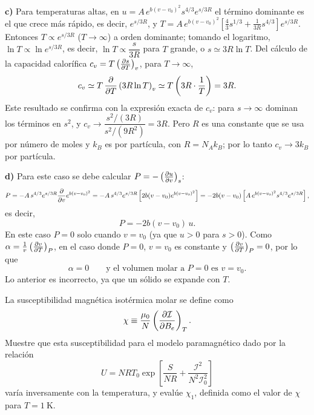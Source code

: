 \begin{solucion}
  \textbf{c)} Para temperaturas altas, en $u=A\,e^{b(v-v_0)^{2}}s^{4/3}e^{s/3R}$ el término dominante es
  el que crece más rápido, es decir, $e^{s/3R}$, y
  $T=A\,e^{b(v-v_0)^{2}}\left[\frac{4}{3}s^{1/3}+\frac{1}{3R}s^{4/3}\right]e^{s/3R}$. Entonces
  $T\propto e^{s/3R}$ ($T\to\infty$) a orden dominante; tomando el logaritmo,
  $\ln T\propto\ln e^{s/3R}$, es decir, $\ln T\propto\dfrac{s}{3R}$ para $T$ grande, o $s\simeq3R\ln T$.
  Del cálculo de la capacidad calorífica $c_v=T\left(\frac{\partial s}{\partial T}\right)_{v}$, para $T\to\infty$,
  \begin{equation*}
    c_v\simeq T\,\pdv{T}\left(3R\ln T\right)_v\simeq T\left(3R\cdot\frac{1}{T}\right)=3R.
  \end{equation*}
  Este resultado se confirma con la expresión exacta de $c_v$: para $s\to\infty$ dominan los términos
  en $s^{2}$, y $c_v\to\dfrac{s^{2}/(3R)}{s^{2}/(9R^{2})}=3R$. Pero $R$ es una constante que se usa por
  número de moles y $k_B$ es por partícula, con $R=N_Ak_B$; por lo tanto $c_v\to3k_B$ por partícula.

  \textbf{d)} Para este caso se debe calcular $P=-\left(\frac{\partial u}{\partial v}\right)_{s}$:
  \begin{equation*}
    P=-A\,s^{4/3}e^{s/3R}\pdv{v}e^{b(v-v_0)^{2}}=-A\,s^{4/3}e^{s/3R}\left[2b(v-v_0)e^{b(v-v_0)^{2}}\right]
    =-2b(v-v_0)\left[A\,e^{b(v-v_0)^{2}}s^{4/3}e^{s/3R}\right],
  \end{equation*}
  es decir,
  \begin{equation*}
    P=-2b(v-v_0)\,u.
  \end{equation*}
  En este caso $P=0$ solo cuando $v=v_0$ (ya que $u>0$ para $s>0$). Como
  $\alpha=\frac{1}{v}\left(\frac{\partial v}{\partial T}\right)_{P}$, en el caso donde $P=0$, $v=v_0$ es constante y
  $\left(\frac{\partial v}{\partial T}\right)_{P}=0$, por lo que
  \begin{equation*}
    \boxed{\alpha=0}\qquad\text{y el volumen molar a }P=0\text{ es }v=v_0.
  \end{equation*}
  Lo anterior es incorrecto, ya que un sólido se expande con $T$.
\end{solucion}

\begin{ejercicio}[3.9.13]
  La susceptibilidad magnética isotérmica molar se define como
  \begin{equation*}
    \chi\equiv\frac{\mu_0}{N}\left(\frac{\partial \mathcal{I}}{\partial B_e}\right)_{T}.
  \end{equation*}
  Muestre que esta susceptibilidad para el modelo paramagnético dado por la relación
  \begin{equation*}
    U=NRT_0\exp\left[\frac{S}{NR}+\frac{\mathcal{I}^{2}}{N^{2}\mathcal{I}_0^{2}}\right]
  \end{equation*}
  varía inversamente con la temperatura, y evalúe $\chi_1$, definida como el valor de $\chi$ para
  $T=1\ \mathrm{K}$.
\end{ejercicio}

